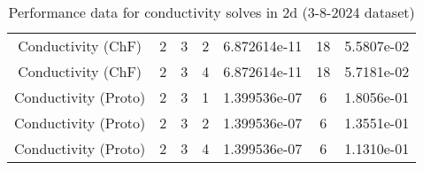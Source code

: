\documentclass{article}
\begin{document}
\begin{small}
\begin{table}
\begin{center}
\begin{tabular}{|c|c|c|c|c|c||c|}
        Conductivity    (ChF) & 2 & 3 & 2& 6.872614e-11 & 18 & 5.5807e-02\\
        Conductivity    (ChF) & 2 & 3 & 4& 6.872614e-11 & 18 & 5.7181e-02\\
        Conductivity  (Proto) & 2 & 3 & 1& 1.399536e-07 & 6 & 1.8056e-01\\
        Conductivity  (Proto) & 2 & 3 & 2& 1.399536e-07 & 6 & 1.3551e-01\\
        Conductivity  (Proto) & 2 & 3 & 4& 1.399536e-07 & 6 & 1.1310e-01\\
        \hline 
      \end{tabular} 
    \end{center}   
    \label{tab::datareductiontable3102024.cond_2} 
    \caption{Performance data for  conductivity solves in 2d (3-8-2024 dataset)}
  \end{table} 
\end{small}
\end{document}

